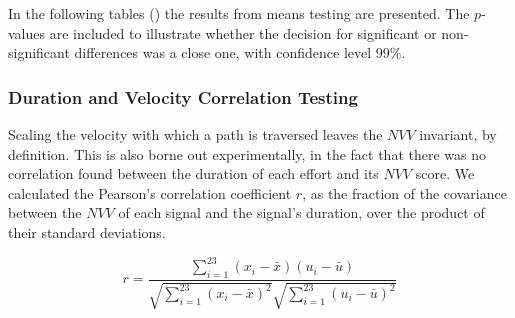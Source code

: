 In the following tables () the results from means testing are presented. The $p$-values are included to illustrate whether the decision for significant or non-significant differences was a close one, with confidence level $99\%$.

 



\subsubsection{Duration and Velocity Correlation Testing}
\label{subsubsec:PenCTDurVelCorTesting}
Scaling the velocity with which a path is traversed leaves the $NVV$ invariant, by definition. This is also borne out experimentally, in the fact that there was no correlation found between the duration of each effort and its $NVV$ score. We calculated the Pearson's correlation coefficient $r$, as the fraction of the covariance between the $NVV$ of each signal and the signal's duration, over the product of their standard deviations. 

\begin{equation} \label{eq:penPearson}
r = \frac{ \sum_{i=1}^{23} (x_{i} - \bar{x})(u_{i} - \bar{u}) } 
		 { \sqrt{\sum_{i=1}^{23} (x_{i} - \bar{x})^{2}} \sqrt{\sum_{i=1}^{23} (u_{i} - \bar{u})^{2}} }
\end{equation}

